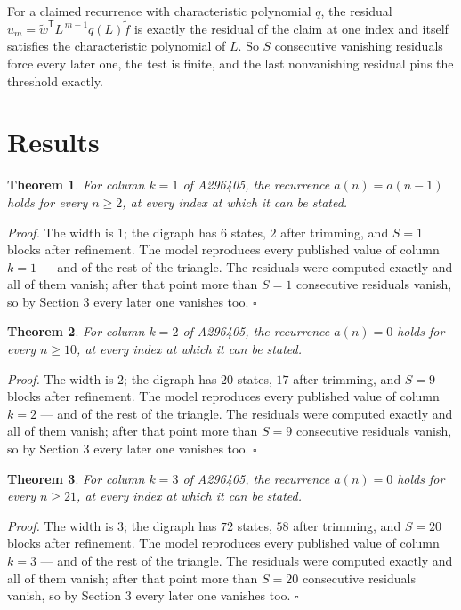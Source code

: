 \documentclass[11pt]{article}
\newtheorem{theorem}{Theorem}
\theoremstyle{definition}
\begin{document}
For a claimed recurrence with characteristic polynomial $q$, the residual $u_m = \tilde w^{\mathsf T}L^{\,m-1}q(L)\tilde f$ is exactly the residual of the claim at one index and itself satisfies the characteristic polynomial of $L$. So $S$ consecutive vanishing residuals force every later one, the test is finite, and the last nonvanishing residual pins the threshold exactly.

\section{Results}

\begin{theorem} For column $k = 1$ of A296405, the recurrence $a(n) = a(n-1)$ holds for every $n \ge 2$, at every index at which it can be stated.\end{theorem}

{\itshape Proof.} The width is $1$; the digraph has $6$ states, $2$ after trimming, and $S = 1$ blocks after refinement. The model reproduces every published value of column $k = 1$ --- and of the rest of the triangle. The residuals were computed exactly and all of them vanish; after that point more than $S = 1$ consecutive residuals vanish, so by Section 3 every later one vanishes too. $\square$

\begin{theorem} For column $k = 2$ of A296405, the recurrence $a(n) = 0$ holds for every $n \ge 10$, at every index at which it can be stated.\end{theorem}

{\itshape Proof.} The width is $2$; the digraph has $20$ states, $17$ after trimming, and $S = 9$ blocks after refinement. The model reproduces every published value of column $k = 2$ --- and of the rest of the triangle. The residuals were computed exactly and all of them vanish; after that point more than $S = 9$ consecutive residuals vanish, so by Section 3 every later one vanishes too. $\square$

\begin{theorem} For column $k = 3$ of A296405, the recurrence $a(n) = 0$ holds for every $n \ge 21$, at every index at which it can be stated.\end{theorem}

{\itshape Proof.} The width is $3$; the digraph has $72$ states, $58$ after trimming, and $S = 20$ blocks after refinement. The model reproduces every published value of column $k = 3$ --- and of the rest of the triangle. The residuals were computed exactly and all of them vanish; after that point more than $S = 20$ consecutive residuals vanish, so by Section 3 every later one vanishes too. $\square$
\end{document}
